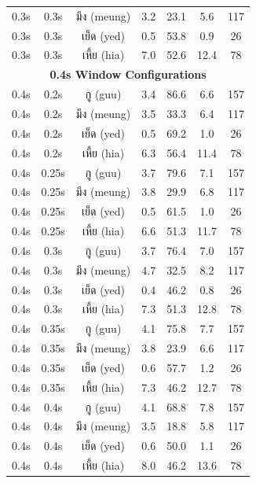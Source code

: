 \documentclass[11pt]{article}
\newcommand{\textthai}[1]{{\thaifont #1}}
\begin{document}
\begin{table}[H]
\begin{tabular}{|c|c|c|c|c|c|c|}
        0.3s & 0.3s & \textthai{มึง} (meung) & 3.2 & 23.1 & 5.6 & 117 \\
        0.3s & 0.3s & \textthai{เย็ด} (yed) & 0.5 & 53.8 & 0.9 & 26 \\
        0.3s & 0.3s & \textthai{เหี้ย} (hia) & 7.0 & 52.6 & 12.4 & 78 \\
        \hline
        \multicolumn{7}{|c|}{\textbf{0.4s Window Configurations}} \\
        \hline
        0.4s & 0.2s & \textthai{กู} (guu) & 3.4 & 86.6 & 6.6 & 157 \\
        0.4s & 0.2s & \textthai{มึง} (meung) & 3.5 & 33.3 & 6.4 & 117 \\
        0.4s & 0.2s & \textthai{เย็ด} (yed) & 0.5 & 69.2 & 1.0 & 26 \\
        0.4s & 0.2s & \textthai{เหี้ย} (hia) & 6.3 & 56.4 & 11.4 & 78 \\
        \hline
        0.4s & 0.25s & \textthai{กู} (guu) & 3.7 & 79.6 & 7.1 & 157 \\
        0.4s & 0.25s & \textthai{มึง} (meung) & 3.8 & 29.9 & 6.8 & 117 \\
        0.4s & 0.25s & \textthai{เย็ด} (yed) & 0.5 & 61.5 & 1.0 & 26 \\
        0.4s & 0.25s & \textthai{เหี้ย} (hia) & 6.6 & 51.3 & 11.7 & 78 \\
        \hline
        0.4s & 0.3s & \textthai{กู} (guu) & 3.7 & 76.4 & 7.0 & 157 \\
        0.4s & 0.3s & \textthai{มึง} (meung) & 4.7 & 32.5 & 8.2 & 117 \\
        0.4s & 0.3s & \textthai{เย็ด} (yed) & 0.4 & 46.2 & 0.8 & 26 \\
        0.4s & 0.3s & \textthai{เหี้ย} (hia) & 7.3 & 51.3 & 12.8 & 78 \\
        \hline
        0.4s & 0.35s & \textthai{กู} (guu) & 4.1 & 75.8 & 7.7 & 157 \\
        0.4s & 0.35s & \textthai{มึง} (meung) & 3.8 & 23.9 & 6.6 & 117 \\
        0.4s & 0.35s & \textthai{เย็ด} (yed) & 0.6 & 57.7 & 1.2 & 26 \\
        0.4s & 0.35s & \textthai{เหี้ย} (hia) & 7.3 & 46.2 & 12.7 & 78 \\
        \hline
        0.4s & 0.4s & \textthai{กู} (guu) & 4.1 & 68.8 & 7.8 & 157 \\
        0.4s & 0.4s & \textthai{มึง} (meung) & 3.5 & 18.8 & 5.8 & 117 \\
        0.4s & 0.4s & \textthai{เย็ด} (yed) & 0.6 & 50.0 & 1.1 & 26 \\
        0.4s & 0.4s & \textthai{เหี้ย} (hia) & 8.0 & 46.2 & 13.6 & 78 \\
        \hline
    \end{tabular}
\end{table}
\end{document}
